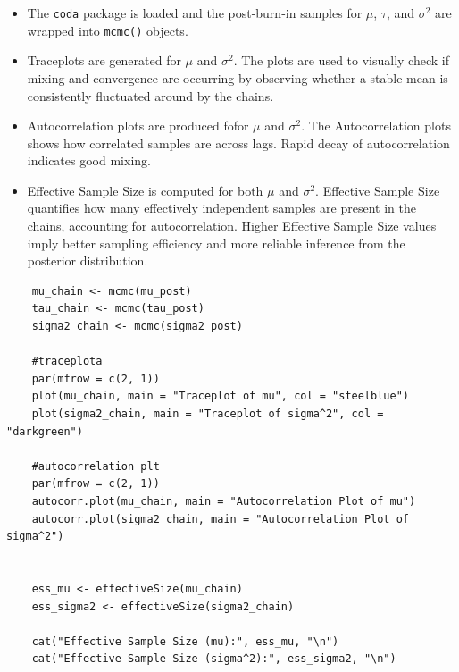 \documentclass[]{article}
\begin{document}
\begin{itemize}
	
	\item The \texttt{coda} package is loaded and the post-burn-in samples for $\mu$, $\tau$, and $\sigma^2$ are wrapped into \texttt{mcmc()} objects.
	
	\item Traceplots are generated for $\mu$ and 
	$\sigma^2$. The plots are used to visually check if mixing and convergence are occurring by observing whether a stable mean is consistently fluctuated around by the chains.
	
	\item Autocorrelation plots  are produced fofor $\mu$ and  $\sigma^2$. The Autocorrelation plots  shows how correlated samples are across lags. Rapid decay of autocorrelation indicates good mixing.
	
	\item Effective Sample Size is computed for both $\mu$ and $\sigma^2$. Effective Sample Size quantifies how many effectively independent samples are present in the chains, accounting for autocorrelation. Higher Effective Sample Size values imply better sampling efficiency and more reliable inference from the posterior distribution.
\end{itemize}

\begin{lstlisting}
	mu_chain <- mcmc(mu_post)
	tau_chain <- mcmc(tau_post)
	sigma2_chain <- mcmc(sigma2_post)
	
	#traceplota
	par(mfrow = c(2, 1))
	plot(mu_chain, main = "Traceplot of mu", col = "steelblue")
	plot(sigma2_chain, main = "Traceplot of sigma^2", col = "darkgreen")
	
	#autocorrelation plt
	par(mfrow = c(2, 1))
	autocorr.plot(mu_chain, main = "Autocorrelation Plot of mu")
	autocorr.plot(sigma2_chain, main = "Autocorrelation Plot of sigma^2")
	
	
	ess_mu <- effectiveSize(mu_chain)
	ess_sigma2 <- effectiveSize(sigma2_chain)
	
	cat("Effective Sample Size (mu):", ess_mu, "\n")
	cat("Effective Sample Size (sigma^2):", ess_sigma2, "\n")
\end{lstlisting}
\end{document}
